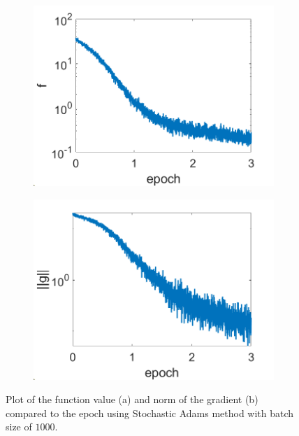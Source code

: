 \documentclass[12pt]{article}%
\begin{document}
\begin{figure}[H]
    \begin{subfigure}[b]{0.5\linewidth}
        \centering
        \includegraphics[width=\linewidth]{images/adams-f.png}
        \caption{}
        \label{Adams:a}
        \vspace{4ex}
    \end{subfigure}%
    \begin{subfigure}[b]{0.5\linewidth}
        \centering
        \includegraphics[width=\linewidth]{images/adams-g.png}
        \caption{}
        \label{Adams:b}
        \vspace{4ex}
    \end{subfigure}
    \caption{Plot of the function value (a) and norm of the gradient (b) compared to the epoch using Stochastic Adams method with batch size of $1000$.}
    \label{Adams}
\end{figure}
\end{document}
